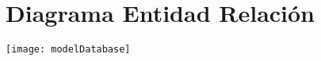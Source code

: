 \chapter{Diagrama Entidad Relación}

\begin{minipage}{1.0\textwidth}
	\centering
	\texttt{[image: modelDatabase]}
\end{minipage}
